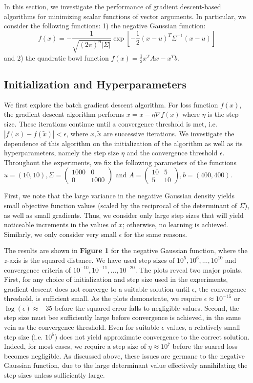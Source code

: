 \documentclass[10pt,psamsfonts]{amsart}
\theoremstyle{definition}
\theoremstyle{remark}
\numberwithin{equation}{section}
\begin{document}
In this section, we investigate the performance of gradient descent-based algorithms for minimizing scalar functions of vector arguments. In particular, we consider the following functions: 1) the negative Gaussian function:
$$f(x) = -\frac{1}{\sqrt{(2\pi)^n |\Sigma|}} \exp\left[ -\frac{1}{2}(x-u)^T\Sigma^{-1}(x-u) \right]$$
and 2) the quadratic bowl function $f(x) = \frac{1}{2}x^TAx - x^Tb$.
\subsection{Initialization and Hyperparameters} We first explore the batch gradient descent algorithm. For loss function $f(x)$, the gradient descent algorithm performs $x = x - \eta \nabla f(x)$
where $\eta$ is the step size. These iterations continue until a convergence threshold is met, i.e. $|f(x) - f(\tilde{x})| < \epsilon$, where $x, \tilde{x}$ are successive iterations. We investigate the dependence of this algorithm on the initialization of the algorithm as well as its hyperparameters, namely the step size $\eta$ and the convergence threshold $\epsilon$. Throughout the experiments, we fix the following parameters of the functions $u = (10, 10),\Sigma = \begin{pmatrix} 1000 & 0 \\ 0 & 1000\end{pmatrix}$ and $A = \begin{pmatrix} 10 & 5 \\ 5 & 10\end{pmatrix},b = (400, 400)$.

First, we note that the large variance in the negative Gaussian density yields small objective function values (scaled by the reciprocal of the determinant of $\Sigma$), as well as small gradients. Thus, we consider only large step sizes that will yield noticeable increments in the values of $x$; otherwise, no learning is achieved. Similarly, we only consider very small $\epsilon$ for the same reasons.

The results are shown in {\bf Figure 1} for the negative Gaussian function, where the $z$-axis is the squared distance. We have used step sizes of $10^5, 10^6, \dots, 10^10$ and convergence criteria of $10^{-10}, 10^{-11}, \dots, 10^{-20}$. The plots reveal two major points. First, for any choice of initialization and step size used in the experiments, gradient descent does not converge to a suitable solution until $\epsilon$, the convergence threshold, is sufficient small. As the plots demonstrate, we require $\epsilon \approx 10^{-15}$ or $\log(\epsilon) \approx -35$ before the squared error falls to negligible values. Second, the step size must bee sufficiently large before convergence is achieved, in the same vein as the convergence threshold. Even for suitable $\epsilon$ values, a relatively small step size (i.e. $10^5$) does not yield approximate convergence to the correct solution. Indeed, for most cases, we require a step size of $\eta \approx 10^7$ before the suared loss becomes negligible. As discussed above, these issues are germane to the negative Gaussian function, due to the large determinant value effectively annihilating the step sizes unless sufficiently large.
\end{document}
